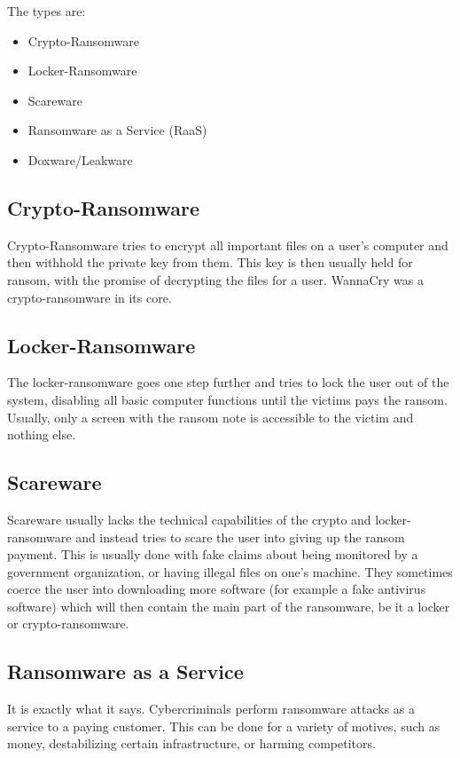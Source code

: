 The types are:
\begin{itemize}
    \item Crypto-Ransomware
    \item Locker-Ransomware
    \item Scareware
    \item Ransomware as a Service (RaaS)
    \item Doxware/Leakware
\end{itemize}

\subsection{Crypto-Ransomware}

Crypto-Ransomware tries to encrypt all important files on a user's computer and then withhold the private key from them.
This key is then usually held for ransom, with the promise of decrypting the files for a user.
WannaCry was a crypto-ransomware in its core.

\subsection{Locker-Ransomware}

The locker-ransomware goes one step further and tries to lock the user out of the system, disabling all basic computer functions until the victims pays the ransom.
Usually, only a screen with the ransom note is accessible to the victim and nothing else.

\subsection{Scareware}

Scareware usually lacks the technical capabilities of the crypto and locker-ransomware and instead tries to scare the user into giving up the ransom payment.
This is usually done with fake claims about being monitored by a government organization, or having illegal files on one's machine.
They sometimes coerce the user into downloading more software (for example a fake antivirus software) which will then contain the main part of the ransomware, be it a locker or crypto-ransomware.

\subsection{Ransomware as a Service}

It is exactly what it says.
Cybercriminals perform ransomware attacks as a service to a paying customer.
This can be done for a variety of motives, such as money, destabilizing certain infrastructure, or harming competitors.


